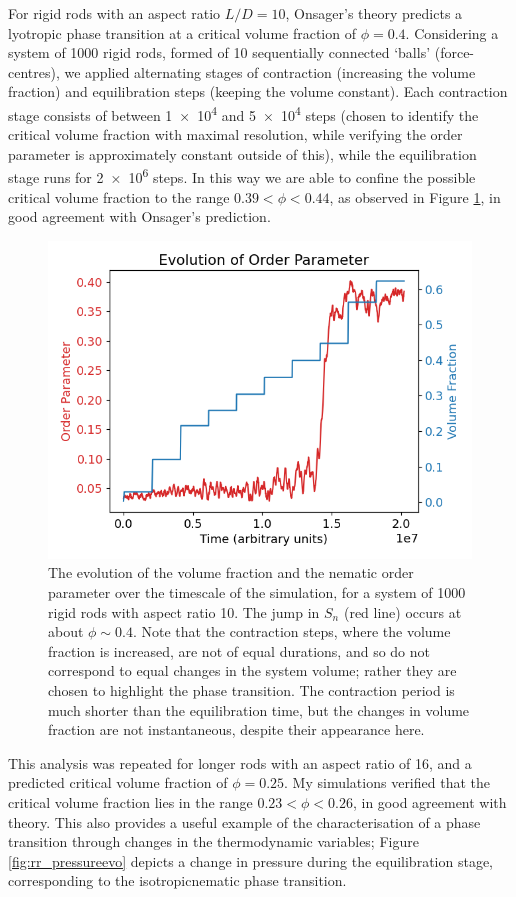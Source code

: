 \documentclass[11pt, a4paper]{article} %
\begin{document}
For rigid rods with an aspect ratio $L/D = 10$, Onsager's theory predicts a lyotropic phase transition at a critical volume fraction of $\phi  = 0.4$. Considering a system of \num{1000} rigid rods, formed of \num{10} sequentially connected `balls' (force-centres), we applied alternating stages of contraction (increasing the volume fraction) and equilibration steps (keeping the volume constant). Each contraction stage consists of between \num{1e4} and \num{5e4} steps (chosen to identify the critical volume fraction with maximal resolution, while verifying the order parameter is approximately constant outside of this), while the equilibration stage runs for \num{2e6} steps. In this way we are able to confine the possible critical volume fraction to the range $0.39 < \phi< 0.44$, as observed in Figure \ref{fig:rr_nemorderparam}, in good agreement with Onsager's prediction.

\begin{figure} [h!]
	\centering
	\includegraphics[width=0.7\linewidth]{Figures/rigidrod_nemorderparam}
	\caption{The evolution of the volume fraction and the nematic order parameter over the timescale of the simulation, for a system of 1000 rigid rods with aspect ratio 10. The jump in $S_n$ (red line) occurs at about $\phi \sim 0.4$. Note that the contraction steps, where the volume fraction is increased, are not of equal durations, and so do not correspond to equal changes in the system volume; rather they are chosen to highlight the phase transition. The contraction period is much shorter than the equilibration time, but the changes in volume fraction are not instantaneous, despite their appearance here.}
	\label{fig:rr_nemorderparam}
\end{figure}  %

This analysis was repeated for longer rods with an aspect ratio of \num{16}, and a predicted critical volume fraction of $\phi  = 0.25$. My simulations verified that the critical volume fraction lies in the range $0.23 < \phi< 0.26$, in good agreement with theory. This also provides a useful example of the characterisation of a phase transition through changes in the thermodynamic variables; Figure \ref{fig:rr_pressureevo} depicts a change in pressure during the equilibration stage, corresponding to the isotropic\textendash nematic phase transition.
\end{document}
